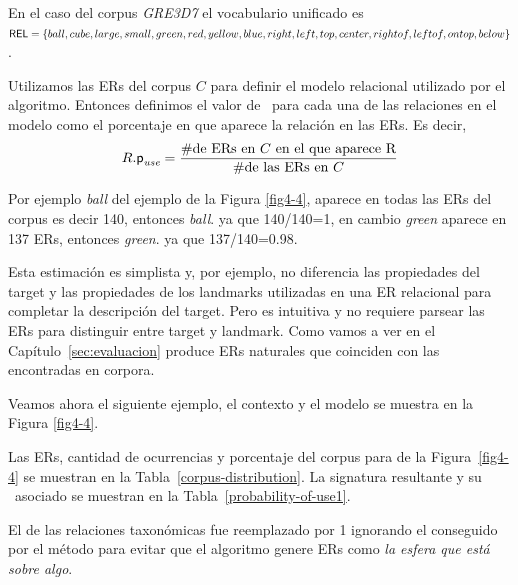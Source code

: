 En el caso del corpus \textit{GRE3D7} el vocabulario unificado es 
$\textsf{REL} = \{ball, cube, large, small,\\
green, red, yellow, blue, right, left, top, center, rightof, leftof, ontop,
below\} $.

 Utilizamos las ERs del corpus $C$
para definir el modelo relacional utilizado por el algoritmo. Entonces 
definimos el valor de \puse\ para cada una de las relaciones en el modelo como el
porcentaje en que aparece la relaci\'on en las ERs. Es decir,
\begin{equation} \label{eq1}
R.\textsf{p}_\textit{use} = \frac {\#\mbox{de ERs en $C$ en el que aparece R}} {\#\mbox{de las ERs en $C$}}
\end{equation}

Por ejemplo {\it ball} del ejemplo de la Figura \ref{fig4-4}, aparece en todas las ERs del corpus es decir 140, entonces {\it ball}. ya que 140/140=1, en cambio {\it green} aparece en 137 ERs, entonces {\it green}. ya que 137/140=0.98.

Esta estimaci\'on es simplista y, por ejemplo, no 
diferencia las propiedades del target y las propiedades de
los landmarks utilizadas en una ER relacional para completar la descripci\'on
del target. Pero es intuitiva y no requiere parsear las ERs para distinguir entre target y landmark. Como vamos a ver
en el Cap\'itulo~\ref{sec:evaluacion} produce ERs naturales
que coinciden con las encontradas en corpora.

Veamos ahora el siguiente ejemplo, el contexto y el modelo se muestra en la Figura \ref{fig4-4}.


Las ERs, cantidad de ocurrencias y porcentaje del corpus para de la Figura~\ref{fig4-4} se muestran en la Tabla~\ref{corpus-distribution}. La signatura resultante y su \puse\ asociado se muestran en la Tabla~\ref{probability-of-use1}.

El \puse de las relaciones taxon\'omicas fue reemplazado por 1 ignorando el \puse conseguido por el m\'etodo para evitar que el algoritmo genere ERs como {\it la esfera que est\'a sobre algo}.

